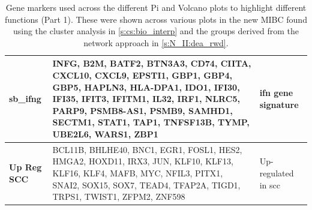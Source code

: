 \begin{table}[H]
\begin{tabularx}{\textwidth}{>{\hsize=0.6\hsize}X|>{\hsize=1.4\hsize}X|>{\hsize=1\hsize}X}
        \midrule
        \textbf{sb\_ifng} & INFG, B2M, BATF2, BTN3A3, CD74, CIITA, CXCL10, CXCL9, EPSTI1, GBP1, GBP4, GBP5, HAPLN3, HLA-DPA1, IDO1, IFI30, IFI35, IFIT3, IFITM1, IL32, IRF1, NLRC5, PARP9, PSMB8-AS1, PSMB9, SAMHD1, SECTM1, STAT1, TAP1, TNFSF13B, TYMP, UBE2L6, WARS1, ZBP1 & \acrfull{ifn} gene signature \citep{Baker2022-bj} \\
        \midrule
        \textbf{Up Reg SCC} & BCL11B, BHLHE40, BNC1, EGR1, FOSL1, HES2, HMGA2, HOXD11, IRX3, JUN, KLF10, KLF13, KLF16, KLF4, MAFB, MYC, NFIL3, PITX1, SNAI2, SOX15, SOX7, TEAD4, TFAP2A, TIGD1, TRPS1, TWIST1, ZFPM2, ZNF598 & Up-regulated in \acrfull{scc} \citep{Hurst2022-sp} \\
        \bottomrule
    \end{tabularx}
    \caption[Gene markers used in pi-plots - part 1]{Gene markers used across the different Pi and Volcano plots to highlight different functions (Part 1). These were shown across various plots in the new MIBC found using the cluster analysis in \cref{s:cs:bio_interp} and the groups derived from the network approach in \cref{s:N_II:dea_rwd}. }
    \label{tab:ap:pi_genes_1}
\end{table}


